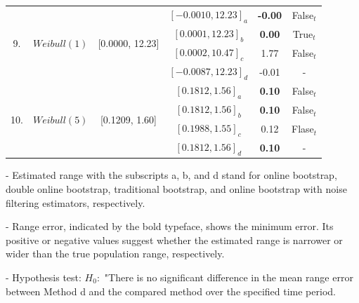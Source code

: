 \documentclass[a4paper,fleqn]{cas-dc}
\begin{document}
\begin{table}[h!]
\begin{threeparttable}
\begin{tabular}{|c|c|c|c|c|c|}
\hline
\multirow{4}{*}{9.} & \multirow{4}{*}{$Weibull(1)$}&\multirow{4}{*}{[0.0000, 12.23]} & $[-0.0010, 12.23]_a$& 
    \bf{-0.00} & False$_t$\\
    &&&$[0.0001, 12.23]_b$ & \bf{0.00} & True$_t$\\
    &&&$[0.0002, 10.47]_c$ & 1.77      & False$_t$\\
    &&&$[-0.0087, 12.23]_d$ & -0.01 & - \\  
\hline
\multirow{4}{*}{10.} & \multirow{4}{*}{$Weibull(5)$}&\multirow{4}{*}{[0.1209, 1.60]} & $[0.1812, 1.56]_a$& 
    \bf{0.10} & False$_t$\\
    &&&$[0.1812, 1.56]_b$ & \bf{0.10} & False$_t$\\
    &&&$[0.1988, 1.55]_c$ & 0.12      & Flase$_t$\\
    &&&$[0.1812, 1.56]_d$ & \bf{0.10} & - \\    
\bottomrule
\end{tabular}
\begin{tablenotes}
          \scriptsize
          \item - Estimated range with the subscripts a, b, and d stand for online bootstrap, double online bootstrap, traditional bootstrap, and online bootstrap with noise filtering estimators, respectively.
          \item - Range error, indicated by the bold typeface, shows the minimum error. Its positive or negative values suggest whether the estimated range is narrower or wider than the true population range, respectively.
         \item - Hypothesis test: $H_0:$ "There is no significant difference in the mean range error between Method d and 
         the compared method over the specified time period.
    \end{tablenotes}
\end{threeparttable}
\end{table}
\end{document}

